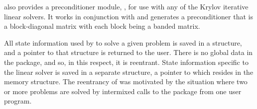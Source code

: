 {\ida} also provides a preconditioner module, {\idabbdpre}, for use
with any of the Krylov iterative linear solvers.  It works in
conjunction with {\nvecp} and generates a preconditioner that is a
block-diagonal matrix with each block being a banded matrix.

All state information used by {\ida} to solve a given problem is saved
in a structure, and a pointer to that structure is returned to the
user.  There is no global data in the {\ida} package, and so, in this
respect, it is reentrant. State information specific to the linear
solver is saved in a separate structure, a pointer to which resides in
the {\ida} memory structure. The reentrancy of {\ida} was motivated
by the situation where two or more problems are solved by
intermixed calls to the package from one user program.
